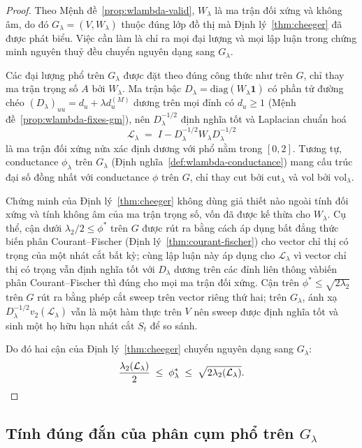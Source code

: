 \begin{proof}
Theo Mệnh đề~\ref{prop:wlambda-valid}, $W_\lambda$ là ma trận đối xứng và không âm, do đó $G_\lambda = (V, W_\lambda)$ thuộc đúng lớp đồ thị mà Định lý~\ref{thm:cheeger} đã được phát biểu. Việc cần làm là chỉ ra mọi đại lượng và mọi lập luận trong chứng minh nguyên thuỷ đều chuyển nguyên dạng sang $G_\lambda$.

Các đại lượng phổ trên $G_\lambda$ được đặt theo đúng công thức như trên $G$, chỉ thay ma trận trọng số $A$ bởi $W_\lambda$. Ma trận bậc $D_\lambda = \mathrm{diag}(W_\lambda \mathbf{1})$ có phần tử đường chéo $(D_\lambda)_{uu} = d_u + \lambda d_u^{(M)}$ dương trên mọi đỉnh có $d_u \geq 1$ (Mệnh đề~\ref{prop:wlambda-fixes-gm}), nên $D_\lambda^{-1/2}$ định nghĩa tốt và Laplacian chuẩn hoá
\[
    \mathcal{L}_\lambda \;=\; I - D_\lambda^{-1/2} W_\lambda D_\lambda^{-1/2}
\]
là ma trận đối xứng nửa xác định dương với phổ nằm trong $[0, 2]$. Tương tự, conductance $\phi_\lambda$ trên $G_\lambda$ (Định nghĩa~\ref{def:wlambda-conductance}) mang cấu trúc đại số đồng nhất với conductance $\phi$ trên $G$, chỉ thay $\mathrm{cut}$ bởi $\mathrm{cut}_\lambda$ và $\mathrm{vol}$ bởi $\mathrm{vol}_\lambda$.

Chứng minh của Định lý~\ref{thm:cheeger} không dùng giả thiết nào ngoài tính đối xứng và tính không âm của ma trận trọng số, vốn đã được kế thừa cho $W_\lambda$. Cụ thể, cận dưới $\lambda_2 / 2 \leq \phi^*$ trên $G$ được rút ra bằng cách áp dụng bất đẳng thức biến phân Courant--Fischer (Định lý~\ref{thm:courant-fischer}) cho vector chỉ thị có trọng của một nhát cắt bất kỳ; cùng lập luận này áp dụng cho $\mathcal{L}_\lambda$ vì vector chỉ thị có trọng vẫn định nghĩa tốt với $D_\lambda$ dương trên các đỉnh liên thông vàbiến phân Courant--Fischer thì đúng cho mọi ma trận đối xứng. Cận trên $\phi^* \leq \sqrt{2 \lambda_2}$ trên $G$ rút ra bằng phép cắt sweep trên vector riêng thứ hai; trên $G_\lambda$, ánh xạ $D_\lambda^{-1/2} v_2(\mathcal{L}_\lambda)$ vẫn là một hàm thực trên $V$ nên sweep được định nghĩa tốt và sinh một họ hữu hạn nhát cắt $S_t$ để so sánh.

Do đó hai cận của Định lý~\ref{thm:cheeger} chuyển nguyên dạng sang $G_\lambda$:
\[
    \frac{\lambda_2(\mathcal{L}_\lambda)}{2} \;\leq\; \phi_\lambda^* \;\leq\; \sqrt{2 \lambda_2(\mathcal{L}_\lambda)}. \qedhere
\]
\end{proof}

\subsection{Tính đúng đắn của phân cụm phổ trên $G_\lambda$}

